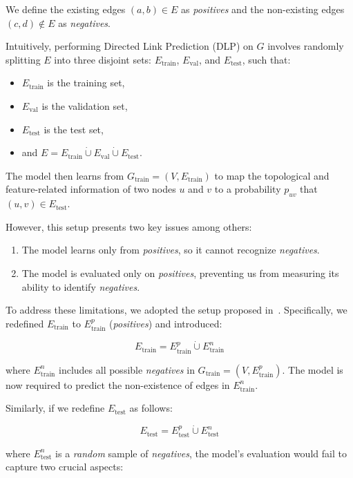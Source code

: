 We define the existing edges $(a, b) \in E$ as \emph{positives} and the non-existing edges
$(c, d) \notin E$ as \emph{negatives}.

Intuitively, performing Directed Link Prediction (DLP) on $G$ involves randomly splitting $E$
into three disjoint sets: $E_{\text{train}}$, $E_{\text{val}}$, and $E_{\text{test}}$, such that:

\begin{itemize}
    \item $E_{\text{train}}$ is the training set,
    \item $E_{\text{val}}$ is the validation set,
    \item $E_{\text{test}}$ is the test set,
    \item and $E = E_{\text{train}} \dot{\cup} E_{\text{val}} \dot{\cup} E_{\text{test}}$.
\end{itemize}

The model then learns from $G_{\text{train}} = (V, E_{\text{train}})$ to map the topological and
feature-related information of two nodes $u$ and $v$ to a probability $p_{uv}$ that
$(u, v) \in E_{\text{test}}$.

However, this setup presents two key issues among others:

\begin{enumerate}
    \item The model learns only from \emph{positives}, so it cannot recognize \emph{negatives}.
    \item The model is evaluated only on \emph{positives}, preventing us from measuring its ability
    to identify \emph{negatives}.
\end{enumerate}

To address these limitations, we adopted the setup proposed in~\cite{Salha2019}.
Specifically, we redefined $E_{\text{train}}$ to $E_{\text{train}}^p$ (\emph{positives}) and introduced:

\[
E_{\text{train}} = E_{\text{train}}^p \dot{\cup} E_{\text{train}}^n
\]

where $E_{\text{train}}^n$ includes all possible \emph{negatives} in $G_{\text{train}} = (V, E_{\text{train}}^p)$.
The model is now required to predict the non-existence of edges in $E_{\text{train}}^n$.

Similarly, if we redefine $E_{\text{test}}$ as follows:

\[
E_{\text{test}} = E_{\text{test}}^p \dot{\cup} E_{\text{test}}^n
\]

where $E_{\text{test}}^n$ is a \emph{random} sample of \emph{negatives}, the model's evaluation
would fail to capture two crucial aspects:

